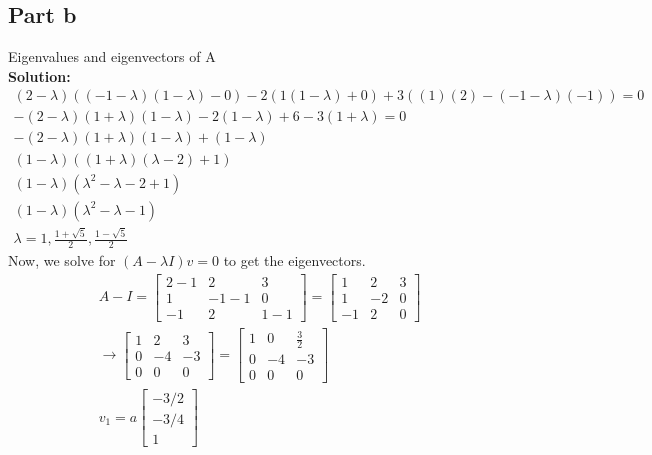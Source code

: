 \documentclass[11pt]{article}
\begin{document}
\subsection{Part b}
Eigenvalues and eigenvectors of A
\\
\textbf{Solution: }
\begin{gather*}
    (2- \lambda) ((-1 - \lambda)(1 - \lambda) - 0) - 2(1(1- \lambda) + 0) + 3((1)(2) - (-1-\lambda)(-1)) = 0 \\
    -(2-\lambda)(1+\lambda)(1-\lambda) -2(1-\lambda) + 6 -3(1+\lambda) = 0 \\
    -(2-\lambda)(1+\lambda)(1-\lambda) + (1-\lambda) \\
    (1-\lambda)((1+\lambda)(\lambda-2)+1) \\
    (1-\lambda)(\lambda^2 - \lambda -2 +1) \\
    (1-\lambda)(\lambda^2 - \lambda -1) \\
    \lambda = 1, \frac{1+\sqrt{5}}{2}, \frac{1 - \sqrt{5}}{2}
\end{gather*}
Now, we solve for $(A-\lambda I)v = 0$ to get the eigenvectors.
\begin{align*}
  A - I = 
\begin{bmatrix}
   2 -1 & 2 & 3 \\
   1 & -1 -1 &0 \\
   -1 & 2 & 1 -1
\end{bmatrix}
= 
\begin{bmatrix}
  1 & 2 & 3 \\
  1 & -2 &0 \\
  -1 & 2 & 0
\end{bmatrix}
\\ 
\longrightarrow
\begin{bmatrix}
  1 & 2 & 3 \\
  0 & -4 & -3 \\
  0 & 0 & 0
\end{bmatrix}
=
\begin{bmatrix}
  1 & 0 & \frac{3}{2} \\
  0 & -4 & -3 \\
  0 & 0 & 0
\end{bmatrix}
\\
v_1 = a
\begin{bmatrix}
  -3/2 \\
  -3/4 \\
  1
\end{bmatrix}
\end{align*}
\end{document}
